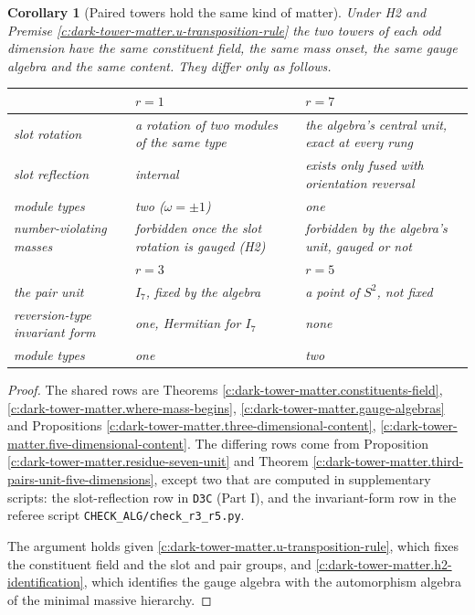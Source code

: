 \documentclass[11pt]{article}
\newtheorem{corollary}[theorem]{Corollary}
\theoremstyle{definition}
\theoremstyle{plain}
\newcommand{\changedmark}[2]{\marginpar{\raggedright\scriptsize\color{#1}#2}}
\providecommand{\file}{}\renewcommand{\file}[1]{\texttt{#1}}
\begin{document}
\begin{corollary}[Paired towers hold the same kind of matter]\label{c:dark-tower-matter.same-kind-matter}
\changedmark{BurntOrange}{changed since the deposit}
Under H2 and Premise \ref{c:dark-tower-matter.u-transposition-rule} the two towers of each odd dimension have the same constituent field, the same mass onset, the same gauge algebra and the same content. They differ only as follows.
\begin{center}\small
\begin{tabular}{@{}p{3.6cm}p{4.9cm}p{4.9cm}@{}}
\toprule
 & $r = 1$ & $r = 7$ \\
\midrule
slot rotation & a rotation of two modules of the same type & the algebra's central unit, exact at every rung \\
slot reflection & internal & exists only fused with orientation reversal \\
module types & two ($\omega = \pm 1$) & one \\
number-violating masses & forbidden once the slot rotation is gauged (H2) & forbidden by the algebra's unit, gauged or not \\
\midrule
 & $r = 3$ & $r = 5$ \\
\midrule
the pair unit & $I_{7}$, fixed by the algebra & a point of $S^{2}$, not fixed \\
reversion-type invariant form & one, Hermitian for $I_{7}$ & none \\
module types & one & two \\
\bottomrule
\end{tabular}
\end{center}
\end{corollary}
\begin{proof}
The shared rows are Theorems \ref{c:dark-tower-matter.constituents-field}, \ref{c:dark-tower-matter.where-mass-begins}, \ref{c:dark-tower-matter.gauge-algebras} and Propositions \ref{c:dark-tower-matter.three-dimensional-content}, \ref{c:dark-tower-matter.five-dimensional-content}. The differing rows come from Proposition \ref{c:dark-tower-matter.residue-seven-unit} and Theorem \ref{c:dark-tower-matter.third-pairs-unit-five-dimensions}, except two that are computed in supplementary scripts: the slot-reflection row in \file{D3C} (Part I), and the invariant-form row in the referee script \file{CHECK\_ALG/check\_r3\_r5.py}.

The argument holds given \ref{c:dark-tower-matter.u-transposition-rule}, which fixes the constituent field and the slot and pair groups, and \ref{c:dark-tower-matter.h2-identification}, which identifies the gauge algebra with the automorphism algebra of the minimal massive hierarchy.

\end{proof}
\end{document}
